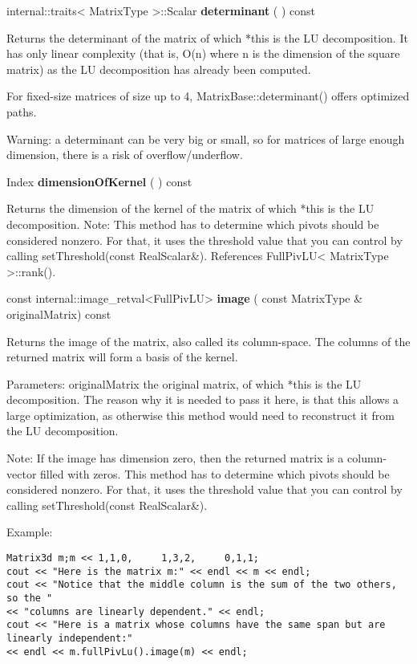 \vspace{0.3cm}
internal::traits< MatrixType >::Scalar \textbf{determinant}  ( )  const 

Returns the determinant of the matrix of which *this is the LU decomposition. It has only linear complexity (that is, O(n) where n is the dimension of the square matrix) as the LU decomposition has already been computed.

For fixed-size matrices of size up to 4, MatrixBase::determinant() offers optimized paths.

Warning: a determinant can be very big or small, so for matrices of large enough dimension, there is a risk of overflow/underflow.


\vspace{0.3cm}
Index \textbf{dimensionOfKernel}  ( )  const 

Returns the dimension of the kernel of the matrix of which *this is the LU decomposition.
Note: This method has to determine which pivots should be considered nonzero. For that, it uses the threshold value that you can control by calling setThreshold(const RealScalar\&). References FullPivLU< MatrixType >::rank().

\vspace{0.3cm}
const internal::image\_retval<FullPivLU> \textbf{image}  ( const MatrixType \&  originalMatrix)  const 

Returns the image of the matrix, also called its column-space. The columns of the returned matrix will form a basis of the kernel.

Parameters: originalMatrix the original matrix, of which *this is the LU decomposition. The reason why it is needed to pass it here, is that this allows a large optimization, as otherwise this method would need to reconstruct it from the LU decomposition. 

Note: If the image has dimension zero, then the returned matrix is a column-vector filled with zeros.
This method has to determine which pivots should be considered nonzero. For that, it uses the threshold value that you can control by calling setThreshold(const RealScalar\&).


Example:

\begin{lstlisting}
Matrix3d m;m << 1,1,0,     1,3,2,     0,1,1;
cout << "Here is the matrix m:" << endl << m << endl;
cout << "Notice that the middle column is the sum of the two others, so the "
<< "columns are linearly dependent." << endl;
cout << "Here is a matrix whose columns have the same span but are linearly independent:"     
<< endl << m.fullPivLu().image(m) << endl;
\end{lstlisting}

